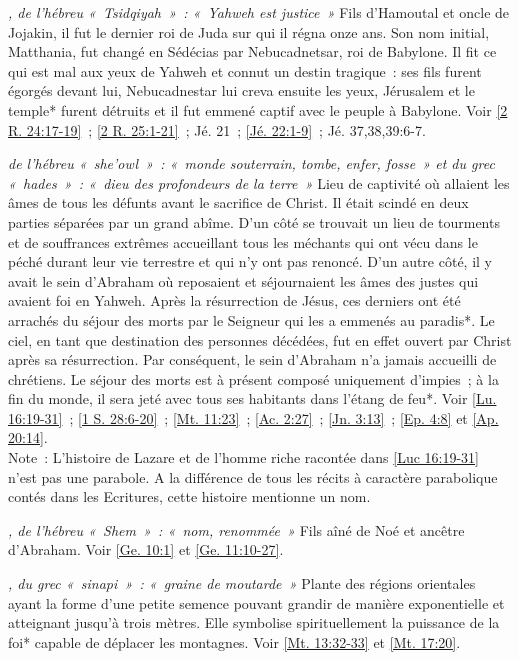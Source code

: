 \begin{multicols}{2}
\textit{, de l'hébreu «~Tsidqiyah~»~: «~Yahweh est justice~»}\newline
Fils d'Hamoutal et oncle de Jojakin, il fut le dernier roi de Juda sur qui il régna onze ans. Son nom initial, Matthania, fut changé en Sédécias par Nebucadnetsar, roi de Babylone. Il fit ce qui est mal aux yeux de Yahweh et connut un destin tragique~: ses fils furent égorgés devant lui, Nebucadnestar lui creva ensuite les yeux, Jérusalem et le temple* furent détruits et il fut emmené captif avec le peuple à Babylone. Voir \vref{2 R. 24:17-19}~; \vref{2 R. 25:1-21}~; Jé. 21~; \vref{Jé. 22:1-9}~; Jé. 37,38,39:6-7.

\textit{de l'hébreu «~she'owl~»~: «~monde souterrain, tombe, enfer, fosse~» et du grec «~hades~»~: «~dieu des profondeurs de la terre~»}\newline
Lieu de captivité où allaient les âmes de tous les défunts avant le sacrifice de Christ. Il était scindé en deux parties séparées par un grand abîme. D'un côté se trouvait un lieu de tourments et de souffrances extrêmes accueillant tous les méchants qui ont vécu dans le péché durant leur vie terrestre et qui n'y ont pas renoncé. D'un autre côté, il y avait le sein d'Abraham où reposaient et séjournaient les âmes des justes qui avaient foi en Yahweh. Après la résurrection de Jésus, ces derniers ont été arrachés du séjour des morts par le Seigneur qui les a emmenés au paradis*. Le ciel, en tant que destination des personnes décédées, fut en effet ouvert par Christ après sa résurrection. Par conséquent, le sein d'Abraham n'a jamais accueilli de chrétiens. Le séjour des morts est à présent composé uniquement d'impies~; à la fin du monde, il sera jeté avec tous ses habitants dans l'étang de feu*.\newline
Voir \vref{Lu. 16:19-31}~; \vref{1 S. 28:6-20}~; \vref{Mt. 11:23}~; \vref{Ac. 2:27}~; \vref{Jn. 3:13}~; \vref{Ep. 4:8} et \vref{Ap. 20:14}.
\\Note~: L'histoire de Lazare et de l'homme riche racontée dans \vref{Luc 16:19-31} n'est pas une parabole. A la différence de tous les récits à caractère parabolique contés dans les Ecritures, cette histoire mentionne un nom.

\textit{, de l'hébreu «~Shem~»~: «~nom, renommée~»}\newline
Fils aîné de Noé et ancêtre d'Abraham. Voir \vref{Ge. 10:1} et \vref{Ge. 11:10-27}.

\textit{, du grec «~sinapi~»~: «~graine de moutarde~»}\newline
Plante des régions orientales ayant la forme d'une petite semence pouvant grandir de manière exponentielle et atteignant jusqu'à trois mètres. Elle symbolise spirituellement la puissance de la foi* capable de déplacer les montagnes. Voir \vref{Mt. 13:32-33} et \vref{Mt. 17:20}.


\end{multicols}
